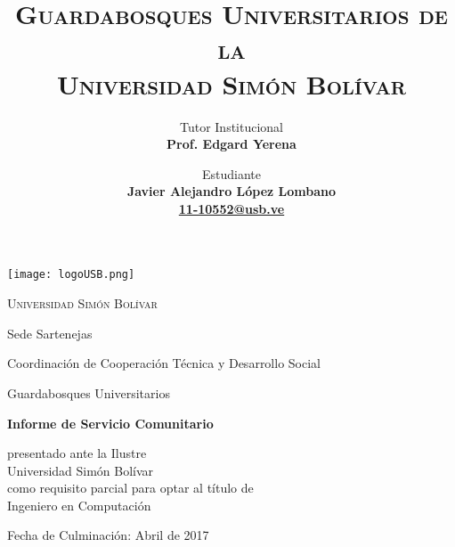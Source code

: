 \documentclass[12pt,letter]{article}
\title{\Large\bfseries\scshape{Guardabosques Universitarios de la \\ Universidad Simón Bolívar\vspace{1cm}}}
\author{
  Tutor Institucional\\
  \bfseries{Prof. Edgard Yerena}
  \and
  \and
  \and
  \and
  Estudiante\\
  \bfseries{Javier Alejandro López Lombano}\\
  \protect\url{11-10552@usb.ve}
}
\date{}
\begin{document}
\begin{titlepage}

    \centering
    \texttt{[image: logoUSB.png]}\par\vspace{1cm}

    {\scshape\Large Universidad Simón Bolívar \par}
    \vspace{0.2cm}
    {Sede Sartenejas \par}
    {Coordinación de Cooperación Técnica y Desarrollo Social \par}
    {Guardabosques Universitarios \par}

    {\let\newpage\relax\maketitle}
    \thispagestyle{empty}

    \vfill

    \vspace{2cm}

    {\bfseries{Informe de Servicio Comunitario} \par}
    {presentado ante la Ilustre \\ Universidad Simón Bolívar \\ como requisito parcial para optar al título de \\ Ingeniero en Computación \par}

    \vfill

    {\large Fecha de Culminación: Abril de 2017}

\end{titlepage}
\end{document}
